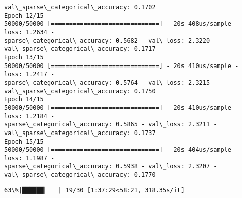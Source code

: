\documentclass[11pt]{article}
\begin{document}
\begin{Verbatim}[commandchars=\\\{\}]
val\_sparse\_categorical\_accuracy: 0.1702
Epoch 12/15
50000/50000 [==============================] - 20s 408us/sample - loss: 1.2634 -
sparse\_categorical\_accuracy: 0.5682 - val\_loss: 2.3220 -
val\_sparse\_categorical\_accuracy: 0.1717
Epoch 13/15
50000/50000 [==============================] - 20s 410us/sample - loss: 1.2417 -
sparse\_categorical\_accuracy: 0.5764 - val\_loss: 2.3215 -
val\_sparse\_categorical\_accuracy: 0.1750
Epoch 14/15
50000/50000 [==============================] - 20s 410us/sample - loss: 1.2184 -
sparse\_categorical\_accuracy: 0.5865 - val\_loss: 2.3211 -
val\_sparse\_categorical\_accuracy: 0.1737
Epoch 15/15
50000/50000 [==============================] - 20s 404us/sample - loss: 1.1987 -
sparse\_categorical\_accuracy: 0.5938 - val\_loss: 2.3207 -
val\_sparse\_categorical\_accuracy: 0.1770
    \end{Verbatim}

    \begin{Verbatim}[commandchars=\\\{\}]
 63\%|██████▎   | 19/30 [1:37:29<58:21, 318.35s/it]
    \end{Verbatim}
\end{document}
